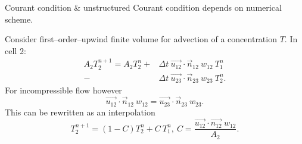 \documentclass[12pt]{beamer}
\begin{document}
\begin{frame}{Courant condition \& unstructured}
  Courant condition depends on numerical scheme.
  \begin{example}
    \small
    \begin{minipage}{0.7\textwidth}
      Consider first--order--upwind finite volume for advection
      of a concentration $T$. In cell 2:
      \begin{align*}
        A_2 T^{n+1}_2 = A_2 T^n_2 
        +& 
        \Delta t~\vec{u_{12}}\cdot\vec n_{12}~w_{12}~T^n_1 \\
        -& \Delta t~\vec{u_{23}}\cdot\vec n_{23}~w_{23}~T^n_2.
      \end{align*}
      For incompressible flow however
      \begin{equation*}
        \vec{u_{12}}\cdot\vec n_{12}~w_{12} = \vec{u_{23}}\cdot\vec
        n_{23}~w_{23}.
      \end{equation*}
      This can be rewritten as an interpolation
      \begin{equation*}
        T^{n+1}_2 = \left(1-C\right) T^n_2 + C~T^n_1,~
          C = \frac{\vec{u_{12}}\cdot\vec{n_{12}}~w_{12}}{A_2}.
      \end{equation*}
    \end{minipage}%
    \begin{minipage}{0.3\textwidth}

\end{minipage}
\end{example}
\end{frame}
\end{document}
